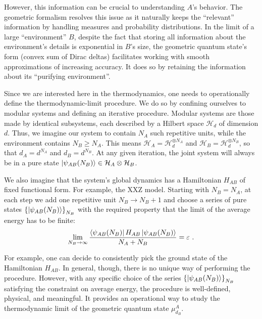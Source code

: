 \documentclass[draft,nofootinbib,pre,twocolumn,showpacs,showkeys,groupaddress,preprintnumbers,floatfix]{revtex4-1}
\newcommand{\1}{\mathbbm{1}}
\begin{document}
However, this information can be crucial to understanding $A$'s behavior. The
geometric formalism resolves this issue as it naturally keeps the ``relevant''
information by handling measures and probability distributions. In the limit of
a large ``environment'' $B$, despite the fact that storing all information
about the environment's details is exponential in $B$'s size, the geometric
quantum state's form (convex sum of Dirac deltas) facilitates working with
smooth approximations of increasing accuracy. It does so by retaining the
information about its ``purifying environment''. 

Since we are interested here in the thermodynamics, one needs to operationally 
define the thermodynamic-limit procedure. We do so by confining ourselves to
modular systems and defining an iterative procedure. Modular systems are those
made by identical subsystems, each described by a Hilbert space $\mathcal{H}_d$
of dimension $d$. Thus, we imagine our system to contain $N_A$ such repetitive
units, while the environment contains $N_B \geq N_A$. This means $\mathcal{H}_A
= \mathcal{H}_d^{\otimes N_A}$ and $\mathcal{H}_B = \mathcal{H}_d^{\otimes
N_B}$, so that $d_A = d^{N_A}$ and $d_B = d^{N_B}$. At any given iteration, the
joint system will always be in a pure state $\ket{\psi_{AB} (N_B)} \in
\mathcal{H}_A \otimes \mathcal{H}_B$.

We also imagine that the system's global dynamics has a Hamiltonian $H_{AB}$ of
fixed functional form. For example, the XXZ model. Starting with $N_B = N_A$,
at each step we add one repetitive unit $N_B \to N_B + 1$ and choose a series
of pure states $\left\{ \ket{\psi_{AB}(N_B)}\right\}_{N_B}$ with the required
property that the limit of the average energy has to be finite:
\begin{align*}
\lim_{N_B \to \infty} \frac{\bra{\psi_{AB}(N_B)}H_{AB} \ket{\psi_{AB}(N_B)}}{N_A + N_B} = \varepsilon
   ~.
\end{align*}

For example, one can decide to consistently pick the ground state of the
Hamiltonian $H_{AB}$. In general, though, there is no unique way of performing
the procedure. However, with any specific choice of the series
$\left\{\ket{\psi_{AB}(N_B)}\right\}_{N_B}$ satisfying the constraint on
average energy, the procedure is well-defined, physical, and meaningful. It
provides an operational way to study the thermodynamic limit of the geometric
quantum state $\mu^A_{d_B}$.
\end{document}
